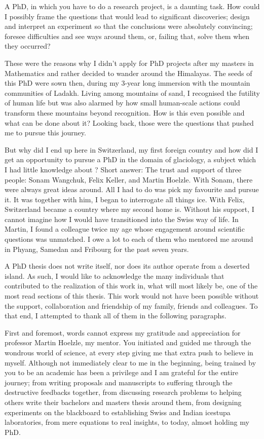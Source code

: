 \label{sec:acknowledgement}

A PhD, in which you have to do a research project, is a daunting task. How could I possibly frame the questions
that would lead to significant discoveries; design and interpret an experiment so that the conclusions were
absolutely convincing; foresee difficulties and see ways around them, or, failing that, solve them when they
occurred?

These were the reasons why I didn't apply for PhD projects after my masters in Mathematics and rather decided
to wander around the Himalayas. The seeds of this PhD were sown then, during my 3-year long immersion with the
mountain communities of Ladakh. Living among mountains of sand, I recognised the futility of human life but was
also alarmed by how small human-scale actions could transform these mountains beyond recognition. How is this
even possible and what can be done about it? Looking back, those were the questions that pushed me to pursue
this journey. 

But why did I end up here in Switzerland, my first foreign country and how did I get an opportunity to pursue a
PhD in the domain of glaciology, a subject which I had little knowledge about ? Short answer: The trust and support
of three people: Sonam Wangchuk, Felix Keller, and Martin Hoelzle. With Sonam, there were always great ideas
around. All I had to do was pick my favourite and pursue it. It was together with him, I began to interrogate
all things ice.  With Felix, Switzerland became a country where my second home is. Without his support, I cannot
imagine how I would have transitioned into the Swiss way of life. In Martin, I found a colleague twice my age
whose engagement around scientific questions was unmatched. I owe a lot to each of them who mentored me around
in Phyang, Samedan and Fribourg for the past seven years.

A PhD thesis does not write itself, nor does its author operate from a deserted island. As such, I would like to
acknowledge the many individuals that contributed to the realization of this work in, what will most likely be,
one of the most read sections of this thesis. This work would not have been possible without the support,
collaboration and friendship of my family, friends and colleagues. To that end, I attempted to thank all of them
in the following paragraphs.

First and foremost, words cannot express my gratitude and appreciation for professor Martin Hoelzle, my mentor.
You initiated and guided me through the wondrous world of science, at every step giving me that extra push to
believe in myself. Although not immediately clear to me in the beginning, being trained by you to be an academic
has been a privilege and I am grateful for the entire journey; from writing proposals and manuscripts to
suffering through the destructive feedbacks together, from discussing research problems to helping others write
their bachelors and masters thesis around them, from designing experiments on the blackboard to establishing
Swiss and Indian icestupa laboratories, from mere equations to real insights, to today, almost holding my PhD.

